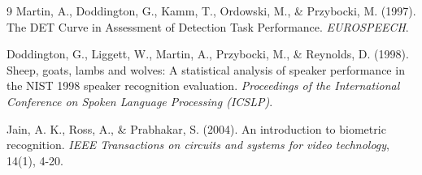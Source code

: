 \documentclass[10pt,twocolumn,letterpaper]{article}
\begin{document}
\begin{thebibliography}{9}
Martin, A., Doddington, G., Kamm, T., Ordowski, M., \& Przybocki, M. (1997).
The DET Curve in Assessment of Detection Task Performance.
\textit{EUROSPEECH}.

Doddington, G., Liggett, W., Martin, A., Przybocki, M., \& Reynolds, D. (1998).
Sheep, goats, lambs and wolves: A statistical analysis of speaker performance in the NIST 1998 speaker recognition evaluation.
\textit{Proceedings of the International Conference on Spoken Language Processing (ICSLP)}.

Jain, A. K., Ross, A., \& Prabhakar, S. (2004).
An introduction to biometric recognition.
\textit{IEEE Transactions on circuits and systems for video technology}, 14(1), 4-20.

\end{thebibliography}
\end{document}
